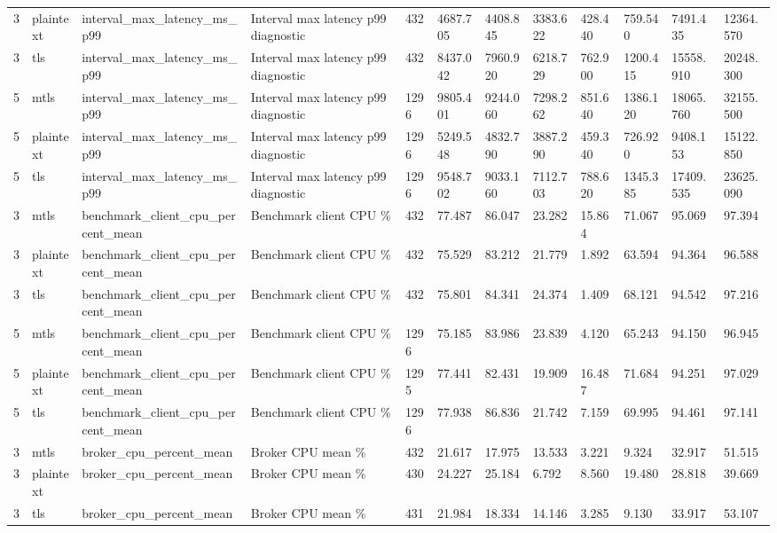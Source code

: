 \begin{longtable}{llllllllllll}
3 & plaintext & interval\_max\_latency\_ms\_p99 & Interval max latency p99 diagnostic & 432 & 4687.705 & 4408.845 & 3383.622 & 428.440 & 759.540 & 7491.435 & 12364.570 \\
3 & tls & interval\_max\_latency\_ms\_p99 & Interval max latency p99 diagnostic & 432 & 8437.042 & 7960.920 & 6218.729 & 762.900 & 1200.415 & 15558.910 & 20248.300 \\
5 & mtls & interval\_max\_latency\_ms\_p99 & Interval max latency p99 diagnostic & 1296 & 9805.401 & 9244.060 & 7298.262 & 851.640 & 1386.120 & 18065.760 & 32155.500 \\
5 & plaintext & interval\_max\_latency\_ms\_p99 & Interval max latency p99 diagnostic & 1296 & 5249.548 & 4832.790 & 3887.290 & 459.340 & 726.920 & 9408.153 & 15122.850 \\
5 & tls & interval\_max\_latency\_ms\_p99 & Interval max latency p99 diagnostic & 1296 & 9548.702 & 9033.160 & 7112.703 & 788.620 & 1345.385 & 17409.535 & 23625.090 \\
3 & mtls & benchmark\_client\_cpu\_percent\_mean & Benchmark client CPU \% & 432 & 77.487 & 86.047 & 23.282 & 15.864 & 71.067 & 95.069 & 97.394 \\
3 & plaintext & benchmark\_client\_cpu\_percent\_mean & Benchmark client CPU \% & 432 & 75.529 & 83.212 & 21.779 & 1.892 & 63.594 & 94.364 & 96.588 \\
3 & tls & benchmark\_client\_cpu\_percent\_mean & Benchmark client CPU \% & 432 & 75.801 & 84.341 & 24.374 & 1.409 & 68.121 & 94.542 & 97.216 \\
5 & mtls & benchmark\_client\_cpu\_percent\_mean & Benchmark client CPU \% & 1296 & 75.185 & 83.986 & 23.839 & 4.120 & 65.243 & 94.150 & 96.945 \\
5 & plaintext & benchmark\_client\_cpu\_percent\_mean & Benchmark client CPU \% & 1295 & 77.441 & 82.431 & 19.909 & 16.487 & 71.684 & 94.251 & 97.029 \\
5 & tls & benchmark\_client\_cpu\_percent\_mean & Benchmark client CPU \% & 1296 & 77.938 & 86.836 & 21.742 & 7.159 & 69.995 & 94.461 & 97.141 \\
3 & mtls & broker\_cpu\_percent\_mean & Broker CPU mean \% & 432 & 21.617 & 17.975 & 13.533 & 3.221 & 9.324 & 32.917 & 51.515 \\
3 & plaintext & broker\_cpu\_percent\_mean & Broker CPU mean \% & 430 & 24.227 & 25.184 & 6.792 & 8.560 & 19.480 & 28.818 & 39.669 \\
3 & tls & broker\_cpu\_percent\_mean & Broker CPU mean \% & 431 & 21.984 & 18.334 & 14.146 & 3.285 & 9.130 & 33.917 & 53.107 \\

\end{longtable}
